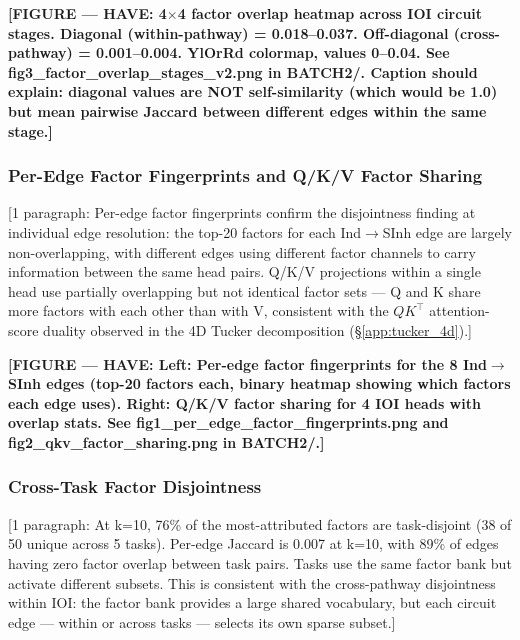 \documentclass[11pt]{article}
\begin{document}
\textbf{[FIGURE --- HAVE: 4$\times$4 factor overlap heatmap across IOI
circuit stages. Diagonal (within-pathway) = 0.018--0.037. Off-diagonal
(cross-pathway) = 0.001--0.004. YlOrRd colormap, values 0--0.04.
See fig3\_factor\_overlap\_stages\_v2.png in BATCH2/.
Caption should explain: diagonal values are NOT self-similarity (which
would be 1.0) but mean pairwise Jaccard between different edges within
the same stage.]}

\subsubsection{Per-Edge Factor Fingerprints and Q/K/V Factor Sharing}
\label{sec:factor_fingerprints}


[1 paragraph: Per-edge factor fingerprints confirm the disjointness
finding at individual edge resolution: the top-20 factors for each
Ind$\to$SInh edge are largely non-overlapping, with different edges
using different factor channels to carry information between the same
head pairs. Q/K/V projections within a single head use partially
overlapping but not identical factor sets --- Q and K share more
factors with each other than with V, consistent with the $QK^\top$
attention-score duality observed in the 4D Tucker decomposition
(\S\ref{app:tucker_4d}).]

\textbf{[FIGURE --- HAVE: Left: Per-edge factor fingerprints for the 8
Ind$\to$SInh edges (top-20 factors each, binary heatmap showing which
factors each edge uses). Right: Q/K/V factor sharing for 4 IOI heads
with overlap stats.
See fig1\_per\_edge\_factor\_fingerprints.png and
fig2\_qkv\_factor\_sharing.png in BATCH2/.]}

\subsubsection{Cross-Task Factor Disjointness}
\label{sec:cross_task_factors}


[1 paragraph: At k=10, 76\% of the most-attributed factors are
task-disjoint (38 of 50 unique across 5 tasks). Per-edge Jaccard is
0.007 at k=10, with 89\% of edges having zero factor overlap between
task pairs. Tasks use the same factor bank but activate different
subsets. This is consistent with the cross-pathway disjointness within
IOI: the factor bank provides a large shared vocabulary, but each
circuit edge --- within or across tasks --- selects its own sparse
subset.]
\end{document}
